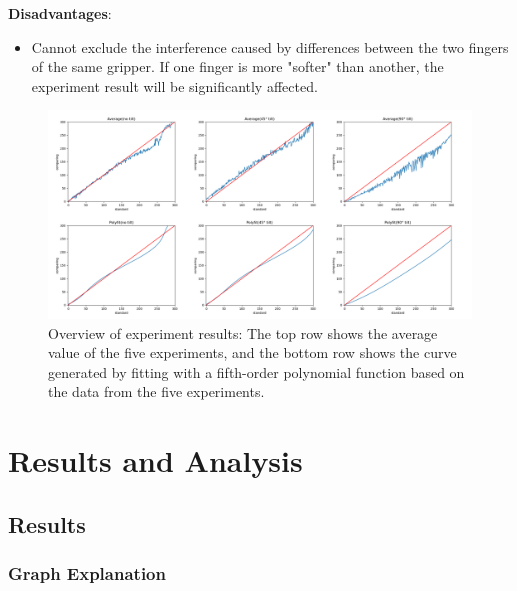 \documentclass[conference]{IEEEtran}
\begin{document}
 \textbf{Disadvantages}:
  \begin{itemize}
     \item Cannot exclude the interference caused by differences between the two fingers of the same gripper. If one finger is more "softer" than another, the experiment result will be significantly affected.
 \end{itemize}


\begin{figure}
    \centerline{\includegraphics[width=1.2\linewidth]{pics/Section3/Overall.png}}
    \caption{Overview of experiment results: The top row shows the average value of the five experiments, and the bottom row shows the curve generated by fitting with a fifth-order polynomial function based on the data from the five experiments.}
    \label{Overall Result}
\end{figure}

\FloatBarrier


\section{Results and Analysis}

\label{results}

\subsection{Results}

\subsubsection{Graph Explanation}
\end{document}
